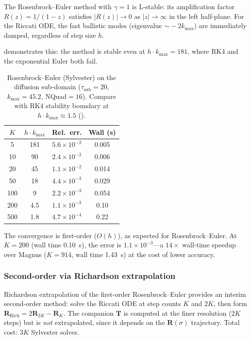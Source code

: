 \documentclass[11pt,a4paper]{article}
\newcommand{\mat}[1]{\mathbf{#1}}
\newcommand{\tsub}{\tau_{\mathrm{sub}}}
\newcommand{\kmax}{k_{\max}}
\theoremstyle{definition}
\begin{document}
The Rosenbrock--Euler method with $\gamma=1$ is L-stable: its
amplification factor $R(z)=1/(1-z)$ satisfies $|R(z)|\to 0$ as
$|z|\to\infty$ in the left half-plane.  For the Riccati ODE, the
fast ballistic modes (eigenvalue $\sim\!-2\kmax$) are immediately
damped, regardless of step size $h$.

 demonstrates this: the method is stable even at
$h\cdot\kmax = 181$, where RK4 and the exponential Euler both fail.

\begin{table}[h]\centering
\caption{Rosenbrock--Euler (Sylvester) on the diffusion sub-domain
($\tsub=20$, $\kmax=45.2$, NQuad${}=16$).  Compare with RK4
stability boundary at $h\cdot\kmax\approx 1.5$ ().}
\label{tab:sylvester}
\begin{tabular}{cccc}
\toprule
$K$ & $h\cdot\kmax$ & Rel.\ err. & Wall (s) \\
\midrule
  5  & 181   & $5.6\times 10^{-2}$ & 0.005 \\
 10  &  90   & $2.4\times 10^{-2}$ & 0.006 \\
 20  &  45   & $1.1\times 10^{-2}$ & 0.014 \\
 50  &  18   & $4.4\times 10^{-3}$ & 0.029 \\
100  &   9   & $2.2\times 10^{-3}$ & 0.054 \\
200  & 4.5   & $1.1\times 10^{-3}$ & 0.10 \\
500  & 1.8   & $4.7\times 10^{-4}$ & 0.22 \\
\bottomrule
\end{tabular}
\end{table}

The convergence is first-order ($O(h)$), as expected for
Rosenbrock--Euler.  At $K=200$ (wall time 0.10~s), the error is
$1.1\times 10^{-3}$---a $14\times$ wall-time speedup over Magnus
($K=914$, wall time 1.43~s) at the cost of lower accuracy.

\subsubsection{Second-order via Richardson extrapolation}
\label{sec:richardson}

Richardson extrapolation of the first-order Rosenbrock--Euler provides
an interim second-order method: solve the Riccati ODE at step counts
$K$ and $2K$, then form
$\mat{R}_{\text{Rich}}=2\mat{R}_{2K}-\mat{R}_K$.
The companion $\mat{T}$ is computed at the finer resolution ($2K$
steps) but is \emph{not} extrapolated, since it depends on the
$\mat{R}(\sigma)$ trajectory.  Total cost: $3K$ Sylvester solves.
\end{document}
